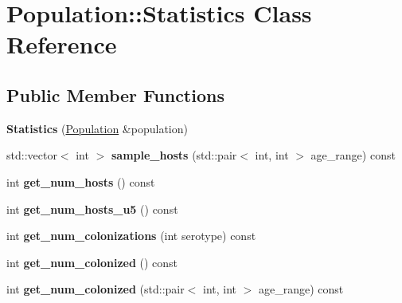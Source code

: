 \hypertarget{class_population_1_1_statistics}{}\section{Population\+:\+:Statistics Class Reference}
\label{class_population_1_1_statistics}
\subsection*{Public Member Functions}
\begin{DoxyCompactItemize}
\item 
\mbox{\label{class_population_1_1_statistics_a0e5330bc6d46da0bbe863babe9aae3d1}} 
{\bfseries Statistics} (\hyperlink{class_population}{Population} \&population)
\item 
\mbox{\label{class_population_1_1_statistics_abac022ba7b84a2ba0d7f50ebb7abf6df}} 
std\+::vector$<$ int $>$ {\bfseries sample\+\_\+hosts} (std\+::pair$<$ int, int $>$ age\+\_\+range) const
\item 
\mbox{\label{class_population_1_1_statistics_a560273b37b9ec7050c9cabcc9e634539}} 
int {\bfseries get\+\_\+num\+\_\+hosts} () const
\item 
\mbox{\label{class_population_1_1_statistics_ab27661587530f3a5193ddc155074be08}} 
int {\bfseries get\+\_\+num\+\_\+hosts\+\_\+u5} () const
\item 
\mbox{\label{class_population_1_1_statistics_aa036ac0119883fdde931541eb81533f1}} 
int {\bfseries get\+\_\+num\+\_\+colonizations} (int serotype) const
\item 
\mbox{\label{class_population_1_1_statistics_accb9ec402cd3ff559e30424f4244851c}} 
int {\bfseries get\+\_\+num\+\_\+colonized} () const
\item 
\mbox{\label{class_population_1_1_statistics_a7513f6ef0d8ce3aa426987c167ad8ecd}} 
int {\bfseries get\+\_\+num\+\_\+colonized} (std\+::pair$<$ int, int $>$ age\+\_\+range) const
\item 

\end{DoxyCompactItemize}
